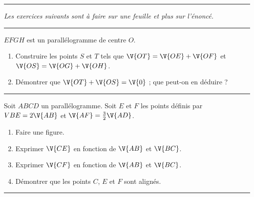 \medskip

\hrule

\medskip

\emph{Les exercices suivants sont \`a faire sur une feuille et plus sur l'\'enonc\'e.}

\medskip

\hrule

\begin{exo}[3,5 points]
 $EFGH$ est un parall\'elogramme de centre $O$.
 \begin{enumerate}
  \item Construire les points $S$ et $T$ tels que $\V{OT}=\V{OE}+\V{OF}$ et $\V{OS}=\V{OG}+\V{OH}$.
  \item D\'emontrer que $\V{OT}+\V{OS}=\V{0}$ ; que peut-on en d\'eduire ?
 \end{enumerate}

\end{exo}

\medskip

\hrule

\begin{exo}[6,5 points]
 Soit $ABCD$ un parall\'elogramme. Soit $E$ et $F$ les points d\'efinis par $V{BE}=2\V{AB}$ et $\V{AF}=\frac{3}{2}\V{AD}$.
 \begin{enumerate}
  \item Faire une figure.
  \item Exprimer $\V{CE}$ en fonction de $\V{AB}$ et $\V{BC}$.
  \item Exprimer $\V{CF}$ en fonction de $\V{AB}$ et $\V{BC}$.
  \item D\'emontrer que les points $C$, $E$ et $F$ sont align\'es.
 \end{enumerate}
\end{exo}

\medskip

\hrule


